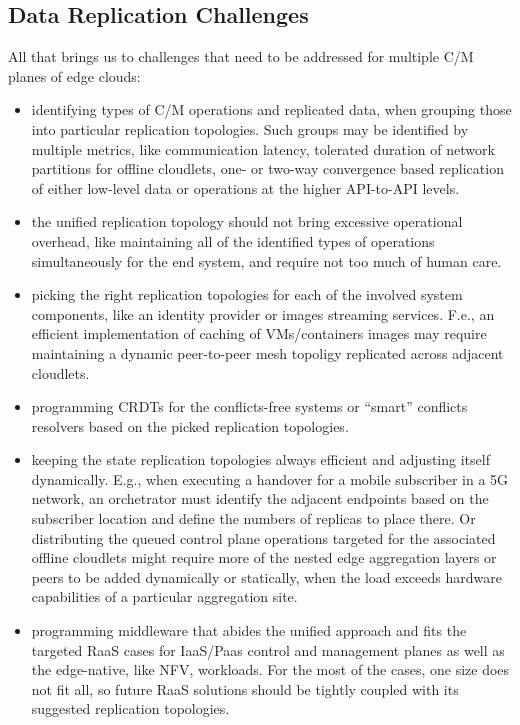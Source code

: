 \documentclass[conference]{IEEEtran}
\begin{document}
\subsection{Data Replication Challenges}
All that brings us to challenges that need to be addressed for multiple C/M
planes of edge clouds:
\begin{itemize}
  \item identifying types of C/M operations and replicated
    data, when grouping those into particular replication topologies. Such
    groups may be identified by multiple metrics, like communication latency,
    tolerated duration of network partitions for offline cloudlets, one- or
    two-way convergence based replication of either low-level data or
    operations at the higher API-to-API levels.
  \item the unified replication topology should not bring excessive operational
    overhead, like maintaining all of the identified types of operations
    simultaneously for the end system, and require not too much of human care.
  \item picking the right replication topologies for each of the involved
    system components, like an identity provider or images streaming services.
    F.e., an efficient implementation of caching of VMs/containers images may
    require maintaining a dynamic peer-to-peer mesh topoligy replicated across
    adjacent cloudlets.
  \item programming CRDTs for the conflicts-free systems or ``smart'' conflicts
    resolvers based on the picked replication topologies.
  \item keeping the state replication topologies always efficient and adjusting
    itself dynamically. E.g., when executing a handover for a mobile subscriber
    in a 5G network, an orchetrator must identify the adjacent endpoints based
    on the subscriber location and define the numbers of replicas to place
    there. Or distributing the queued control plane operations targeted for the
    associated offline cloudlets might require more of the nested edge
    aggregation layers or peers to be added dynamically or statically, when the
    load exceeds hardware capabilities of a particular aggregation site.
  \item programming middleware that abides the unified approach and fits the
    targeted RaaS cases for IaaS/Paas control and management planes as well as
    the edge-native, like NFV, workloads. For the most of the cases, one size
    does not fit all, so future RaaS solutions should be tightly coupled with
    its suggested replication topologies.
\end{itemize}
\end{document}
